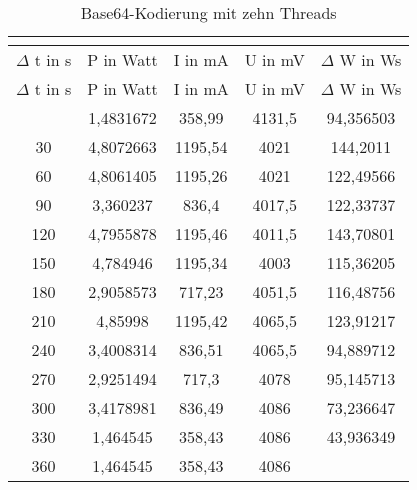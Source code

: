 
\begin{longtable}[c]{ccccc}
\caption{Base64-Kodierung mit zehn Threads} \\
\label{tab:Base64MessungThreadZehn}\\
\hline
{$\Delta$ t in s} & {P in Watt} & {I in mA} & {U in mV} & {$\Delta$ W in Ws} \\
\hline
\endfirsthead
\hline
$\Delta$ t in s & P in Watt & I in mA & U in mV & $\Delta$ W in Ws \\
\hline
\endhead
\hline
\endfoot
\hline
    \midrule
    0     & 1,4831672 & 358,99 & 4131,5 & 94,356503 \\
    \midrule
    30    & 4,8072663 & 1195,54 & 4021  & 144,2011 \\
    \midrule
    60    & 4,8061405 & 1195,26 & 4021  & 122,49566 \\
    \midrule
    90    & 3,360237 & 836,4 & 4017,5 & 122,33737 \\
    \midrule
    120   & 4,7955878 & 1195,46 & 4011,5 & 143,70801 \\
    \midrule
    150   & 4,784946 & 1195,34 & 4003  & 115,36205 \\
    \midrule
    180   & 2,9058573 & 717,23 & 4051,5 & 116,48756 \\
    \midrule
    210   & 4,85998 & 1195,42 & 4065,5 & 123,91217 \\
    \midrule
    240   & 3,4008314 & 836,51 & 4065,5 & 94,889712 \\
    \midrule
    270   & 2,9251494 & 717,3 & 4078  & 95,145713 \\
    \midrule
    300   & 3,4178981 & 836,49 & 4086  & 73,236647 \\
    \midrule
    330   & 1,464545 & 358,43 & 4086  & 43,936349 \\
    \midrule
    360   & 1,464545 & 358,43 & 4086  &  \\
\end{longtable}